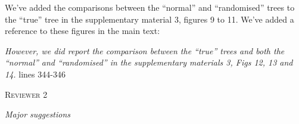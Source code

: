 \documentclass[12pt,letterpaper]{article}
\renewcommand{\section}[1]{%
\bigskip
\begin{center}
\begin{Large}
\normalfont\scshape #1
\medskip
\end{Large}
\end{center}}
\renewcommand{\subsection}[1]{%
\bigskip
\begin{center}
\begin{large}
\normalfont\itshape #1
\end{large}
\end{center}}
\begin{document}
\begin{enumerate}
We've added the comparisons between the ``normal'' and ``randomised'' trees to the ``true'' tree in the supplementary material 3, figures 9 to 11.
We've added a reference to these figures in the main text:

\textit{However, we did report the comparison between the ``true'' trees and both the ``normal'' and ``randomised'' in the supplementary materials 3, Figs 12, 13 and 14.} lines 344-346

\end{enumerate}





%
%





\section{Reviewer 2}

\subsection{Major suggestions}
\end{document}
